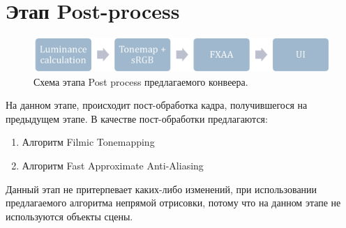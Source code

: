 \section{Этап Post-process} \label{ch3:post_process}
	\begin{figure}[ht!] 
		\center
		\includegraphics [scale=0.4] {my_folder/images//postprocess_schema}	
		\caption{Схема этапа Post process предлагаемого конвеера.} 
		\label{fig:renderpass_schema}
	\end{figure}
	
	На данном этапе, происходит пост-обработка кадра, получившегося на предыдущем этапе. В качестве пост-обработки предлагаются:
	\begin{enumerate}[1.]
		\item Алгоритм Filmic Tonemapping\cite{hable2010uncharted}
		\item Алгоритм Fast Approximate Anti-Aliasing\cite{lottes2009fast}
	\end{enumerate}

	Данный этап не притерпевает каких-либо изменений, при использовании предлагаемого алгоритма непрямой отрисовки, потому что на данном этапе не используются объекты сцены.